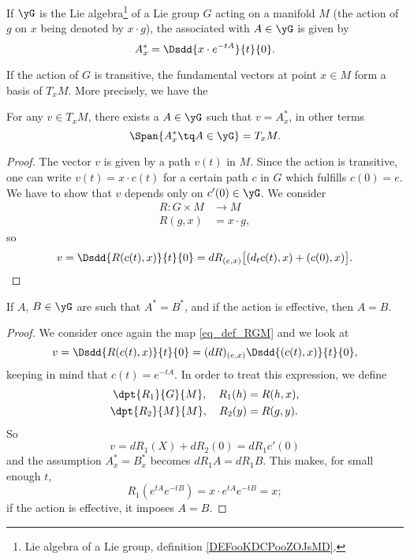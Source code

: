 \begin{definition}
    If $\yG$ is the Lie algebra\footnote{Lie algebra of a Lie group, definition \ref{DEFooKDCPooZOJsMD}.} of a Lie group $G$ acting on a manifold $M$ (the action of $g$ on $x$ being denoted by $x\cdot g$), the  associated with $A\in\yG$ is given by
    \begin{equation}			\label{EqDefChmpFond}
       A^*_x=\Dsdd{ x\cdot e^{-tA} }{t}{0}.
    \end{equation}
\end{definition}

If the action of $G$ is transitive, the fundamental vectors at point $x\in M$ form a basis of $T_xM$. More precisely, we have the

\begin{lemma}
For any $v\in T_xM$, there exists a $A\in\yG$ such that $v=A^*_x$, in other terms
\[
  \Span\{ A^*_{x}\tq A\in\yG \}=T_{x}M.
\]
\label{LemFundSpansTan}
\end{lemma}

\begin{proof}
The vector $v$ is given by a path $v(t)$ in $M$. Since the action is transitive, one can write $v(t)=x\cdot c(t)$ for a certain path $c$ in $G$ which fulfills $c(0)=e$. We have to show that $v$ depends only on $c'(0)\in\yG$. We consider
\begin{equation}  \label{eq_def_RGM}
\begin{aligned}
 R\colon G\times M&\to M \\
R(g,x)&= x\cdot g,
\end{aligned}
\end{equation}
so
\begin{equation}\label{eq:v_Rc}
   v=\Dsdd{ R(c(t),x) }{t}{0}=dR_{(e,x)}\big[  (d_tc(t),x)+(c(0),x)   \big].
\end{equation}

\end{proof}

\begin{lemma}\label{lem:As_Bs_A_B}
If $A$, $B\in\yG$ are such that $A^*=B^*$, and if the action is effective, then $A=B$.
\end{lemma}

\begin{proof}
 We consider once again the map \eqref{eq_def_RGM} and we look at
\[
  v=\Dsdd{ R(c(t),x) }{t}{0}
   =(dR)_{(e,x)}\Dsdd{ (c(t),x) }{t}{0},
\]
keeping in mind that $c(t)=e^{-tA}$. In order to treat this expression, we define
\begin{subequations}
\begin{align}
  \dpt{R_1}{G}{M},\quad  R_1(h)&=R(h,x),\\
  \dpt{R_2}{M}{M},\quad  R_2(y)&=R(g,y).
\end{align}
\end{subequations}
So
\[
  v=dR_1(X)+dR_2(0)=dR_1c'(0)
\]
and the assumption $A^*_x=B^*_x$ becomes $dR_1 A=dR_1 B$. This makes, for small enough $t$, 
\begin{equation}
    R_1(e^{tA}e^{-tB})=x\cdot e^{tA}e^{-tB}=x; 
\end{equation}
if the action is effective, it imposes $A=B$.
\end{proof}

